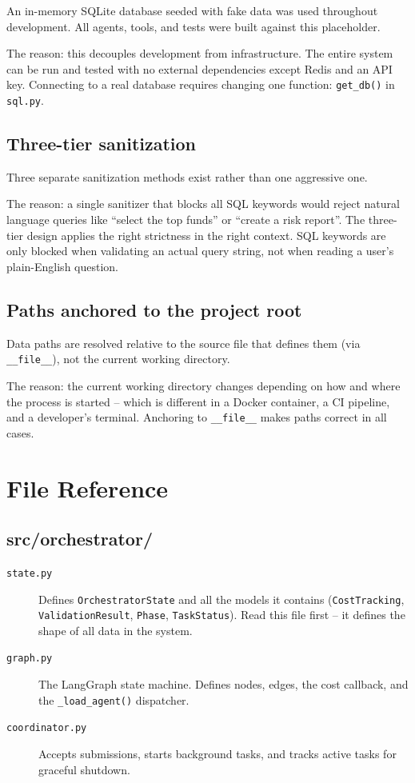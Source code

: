 \documentclass[12pt,a4paper]{article}
\begin{document}
An in-memory SQLite database seeded with fake data was used throughout development. All agents, tools, and tests were built against this placeholder.

The reason: this decouples development from infrastructure. The entire system can be run and tested with no external dependencies except Redis and an API key. Connecting to a real database requires changing one function: \texttt{get\_db()} in \texttt{sql.py}.

\subsection{Three-tier sanitization}

Three separate sanitization methods exist rather than one aggressive one.

The reason: a single sanitizer that blocks all SQL keywords would reject natural language queries like ``select the top funds'' or ``create a risk report''. The three-tier design applies the right strictness in the right context. SQL keywords are only blocked when validating an actual query string, not when reading a user's plain-English question.

\subsection{Paths anchored to the project root}

Data paths are resolved relative to the source file that defines them (via \texttt{\_\_file\_\_}), not the current working directory.

The reason: the current working directory changes depending on how and where the process is started -- which is different in a Docker container, a CI pipeline, and a developer's terminal. Anchoring to \texttt{\_\_file\_\_} makes paths correct in all cases.


\section{File Reference}

\subsection{src/orchestrator/}

\begin{description}
  \item[\texttt{state.py}] Defines \texttt{OrchestratorState} and all the models it contains (\texttt{CostTracking}, \texttt{ValidationResult}, \texttt{Phase}, \texttt{TaskStatus}). Read this file first -- it defines the shape of all data in the system.
  \item[\texttt{graph.py}] The LangGraph state machine. Defines nodes, edges, the cost callback, and the \texttt{\_load\_agent()} dispatcher.
  \item[\texttt{coordinator.py}] Accepts submissions, starts background tasks, and tracks active tasks for graceful shutdown.
\end{description}
\end{document}
